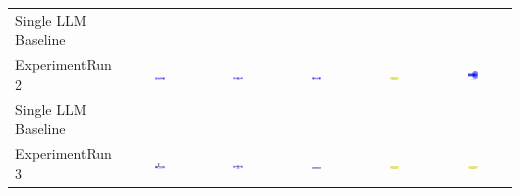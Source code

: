 \begin{table}
\begin{tabular}{@{}lccccc@{}}
    Single LLM Baseline \\
    ExperimentRun 2 & \includegraphics[width=0.15\textwidth]{./run_2/png/gpt-4o_results/DLDChip.png} & \includegraphics[width=0.15\textwidth]{./run_2/png/o1-preview_results/DLDChip.png} & \includegraphics[width=0.15\textwidth]{./run_2/png/claude-3-5-sonnet-20240620_results/DLDChip.png} & \includegraphics[width=0.15\textwidth]{./run_2/png/watsonx_meta-llama_llama-3-1-70b-instruct_results/DLDChip.png} & \includegraphics[width=0.15\textwidth]{./run_2/png/watsonx_meta-llama_llama-3-405b-instruct_results/DLDChip.png} \\
    Single LLM Baseline \\
    ExperimentRun 3 & \includegraphics[width=0.15\textwidth]{./run_3/png/gpt-4o_results/DLDChip.png} & \includegraphics[width=0.15\textwidth]{./run_3/png/o1-preview_results/DLDChip.png} & \includegraphics[width=0.15\textwidth]{./run_3/png/claude-3-5-sonnet-20240620_results/DLDChip.png} & \includegraphics[width=0.15\textwidth]{./run_3/png/watsonx_meta-llama_llama-3-1-70b-instruct_results/DLDChip.png} & \includegraphics[width=0.15\textwidth]{./run_3/png/watsonx_meta-llama_llama-3-405b-instruct_results/DLDChip.png} \\

\end{tabular}
\end{table}
